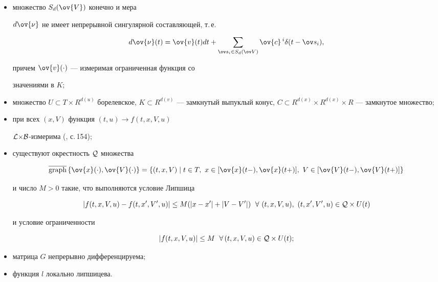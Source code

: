\begin{itemize}


\item[(A1)] множество $S_d(\ov{V})$ конечно  и мера


$d\ov{\nu}$ не имеет непрерывной сингулярной составляющей, т.\,е.


$$


d\ov{\nu}(t)=\ov{v}(t)dt+\sum_{\ov s_i \in


{S}_d(\ov V)}\ov{c}\,^i\delta(t-\ov s_i),


$$


причем $\ov{v}(\cdot)$ --- измеримая ограниченная функция со


значениями в $K$;


\item[(A2)] множество $U\subset T\times R^{d(u)}$ борелевское, $K \subset


R^{d(v)}$ --- замкнутый выпуклый конус, $C\subset R^{d(x)}\times


R^{d(x)}\times R$ --- замкнутое множество;


\item[(A3)] при всех $(x,V)$ функция $(t,u) \rightarrow f(t,x,V,u)$\;


${\cal L}{\times}{\cal B}$-измерима (\cite{K}, с.\,154);


\item[(A4)] существуют окрестность ${\cal Q}$ множества


$$


\overline{\text{graph}}\,\{\ov{x}(\cdot),\ov{V}(\cdot)\}


=\{(t,x,V)\mid t \in T, \ x \in [\ov{x}(t-),\ov{x}(t+)],\ V \in


[\ov{V}(t-),\ov{V}(t+)]\}


$$


и число $M>0$ такие, что выполняются условие Липшица


$$


|f(t,x,V,u)-f(t,x',V',u)| \leq M(|x-x'|+|V-V'|)


\ \; \forall\ (t,x,V,u),\ (t,x',V',u) \in {\cal Q}\times U(t)


$$


и условие ограниченности


$$


|f(t,x,V,u)| \leq M \ \; \forall\,


(t,x,V,u) \in {\cal Q}\times U(t);


$$


\item[(A5)] матрица $G$ непрерывно дифференцируема;


\item[(A6)] функция $l$ локально липшицева.


\end{itemize}





